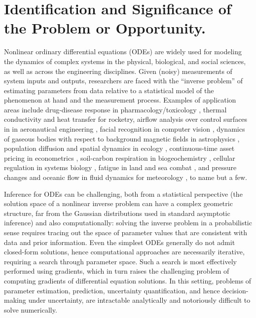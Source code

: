 \section{Identification and Significance of the Problem or Opportunity.}


Nonlinear ordinary differential equations (ODEs) are widely used for modeling
the dynamics of complex systems in the physical, biological, and
social sciences, as well as across the engineering disciplines. Given
(noisy) measurements of system inputs and outputs, researchers are
faced with the ``inverse problem'' of estimating parameters from data
relative to a statistical model of the phenomenon at hand and the
measurement process.  Examples of application areas include
drug-disease response in pharmacology/toxicology
\citep{peterson-rigg:2010, gelman-et-al:1996}, thermal conductivity and
heat transfer for rocketry, airflow analysis over control surfaces in
in aeronautical engineering \citep{alifanov:2012}, facial recognition
in computer vision \citep{aubert-kornprobst:2006, bovik:2010}, dynamics
of gaseous bodies with respect to background magnetic fields in
astrophysics \citep{tobias-et-al:2011}, population diffusion and
spatial dynamics in ecology \citep{gopalsamy:2013}, continuous-time
asset pricing in econometrics \citep{johannes-polson:2010}, soil-carbon
respiration in biogeochemistry \citep{manzoni-porporato:2009}, cellular
regulation in systems biology \citep{baron-gastonguay:2015,
  baron-et-al:2013, leclerc-et-al:2016}, fatigue in land and sea
combat \citep{rubio-campillo:2016}, and pressure changes and oceanic
flow in fluid dynamics for meteorology \citep{charney-phillips:1953},
to name but a few.

Inference for ODEs can be challenging, both from a statistical
perspective (the solution space of a nonlinear inverse problem can
have a complex geometric structure, far from the Gaussian
distributions used in standard asymptotic inference) and also
computationally: solving the inverse problem in a probabilistic sense
requires tracing out the space of parameter values that are consistent
with data and prior information.  Even the simplest ODEs generally do
not admit closed-form solutions, hence computational approaches are
necessarily iterative, requiring a search through parameter space.
Such a search is most effectively performed using gradients, which in
turn raises the challenging problem of computing gradients of
differential equation solutions. In this setting, problems of
parameter estimation, prediction, uncertainty quantification, and
hence decision-making under uncertainty, are intractable analytically
and notoriously difficult to solve numerically.

